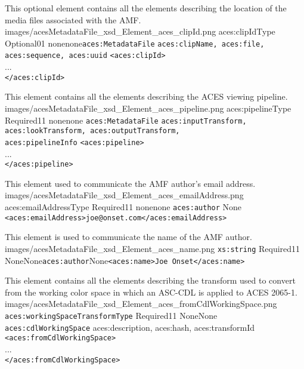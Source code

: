         {This optional element contains all the elements describing the location of the media files associated with the AMF.}
        {images/acesMetadataFile_xsd_Element_aces_clipId.png}
        {aces:clipIdType}
        {Optional}{0}{1}
        {none}{none}{\texttt{aces:MetadataFile}}
        {\texttt{aces:clipName, aces:file, aces:sequence, aces:uuid}}
        {\lstinline{<aces:clipId>} \\
        ... \\
        \lstinline{</aces:clipId>}}

        {This element contains all the elements describing the ACES viewing pipeline.}
        {images/acesMetadataFile_xsd_Element_aces_pipeline.png}
        {aces:pipelineType}
        {Required}{1}{1}
        {none}{none}
        {\texttt{aces:MetadataFile}}
        {\texttt{aces:inputTransform, aces:lookTransform, aces:outputTransform, \\ aces:pipelineInfo}}
        {\lstinline{<aces:pipeline>} \\
        ... \\
        \lstinline{</aces:pipeline>}}

        {This element used to communicate the AMF author's email address.}
        {images/acesMetadataFile_xsd_Element_aces_emailAddress.png}
        {aces:emailAddressType}
        {Required}{1}{1}
        {none}{none}
        {\texttt{aces:author}}
        {None}
        {\lstinline{<aces:emailAddress>joe@onset.com</aces:emailAddress>}}

        {This element is used to communicate the name of the AMF author.}
        {images/acesMetadataFile_xsd_Element_aces_name.png}
        {\texttt{xs:string}}
        {Required}{1}{1}
        {None}{None}{\texttt{aces:author}}{None}{\lstinline{<aces:name>Joe Onset</aces:name>}}

        {This element contains all the elements describing the transform used to convert from the working color space in which an ASC-CDL is applied to ACES 2065-1.}
        {images/acesMetadataFile_xsd_Element_aces_fromCdlWorkingSpace.png}
        {\texttt{aces:workingSpaceTransformType}}
        {Required}{1}{1}
        {None}{None}
        {\texttt{aces:cdlWorkingSpace}}
        {aces:description, aces:hash, aces:transformId}
        {\lstinline{<aces:fromCdlWorkingSpace>} \\
        ... \\
        \lstinline{</aces:fromCdlWorkingSpace>}}


